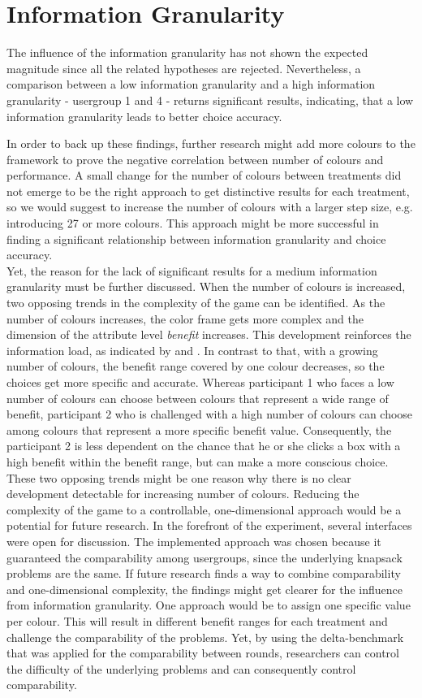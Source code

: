 \section{Information Granularity}

The influence of the information granularity has not shown the expected magnitude since all the related hypotheses are rejected. Nevertheless, a comparison between a low information granularity and a high information granularity - usergroup 1 and 4 - returns significant results, indicating, that a low information granularity leads to better choice accuracy. 

In order to back up these findings, further research might add more colours to the framework to prove the negative correlation between number of colours and performance. A small change for the number of colours between treatments did not emerge to be the right approach to get distinctive results for each treatment, so we would suggest to increase the number of colours with a larger step size, e.g. introducing 27 or more colours. This approach might be more successful in finding a significant relationship between information granularity and choice accuracy.\\
Yet, the reason for the lack of significant results for a medium information granularity must be further discussed. When the number of colours is increased, two opposing trends in the complexity of the game can be identified. As the number of colours increases, the color frame gets more complex and the dimension of the attribute level \textit{benefit} increases. This development reinforces the information load, as indicated by \cite{Jacoby1974} and \cite{Malhotra1982}. In contrast to that, with a growing number of colours, the benefit range covered by one colour decreases, so the choices get more specific and accurate. Whereas participant 1 who faces a low number of colours can choose between colours that represent a wide range of benefit, participant 2 who is challenged with a high number of colours can choose among colours that represent a more specific benefit value. Consequently, the participant 2 is less dependent on the chance that he or she clicks a box with a high benefit within the benefit range, but can make a more conscious choice.\\
These two opposing trends might be one reason why there is no clear development detectable for increasing number of colours. Reducing the complexity of the game to a controllable, one-dimensional approach would be a potential for future research. In the forefront of the experiment, several interfaces were open for discussion. The implemented approach was chosen because it guaranteed the comparability among usergroups, since the underlying knapsack problems are the same. If future research finds a way to combine comparability and one-dimensional complexity, the findings might get clearer for the influence from information granularity. One approach would be to assign one specific value per colour. This will result in different benefit ranges for each treatment and challenge the comparability of the problems. Yet, by using the delta-benchmark that was applied for the comparability between rounds, researchers can control the difficulty of the underlying problems and can consequently control comparability.

